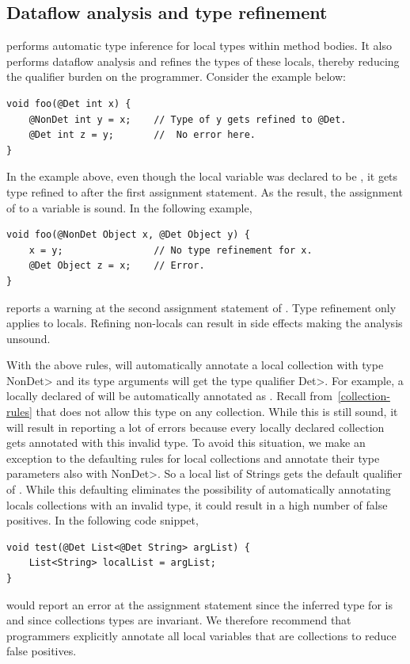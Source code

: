 \subsection{Dataflow analysis and type refinement}\label{dataflow}
\TheDeterminismChecker performs automatic type inference for local types within method bodies.
It also performs dataflow analysis and refines the types of these locals, thereby reducing the qualifier burden 
on the programmer. Consider the example below:
\begin{verbatim}
void foo(@Det int x) {
    @NonDet int y = x;    // Type of y gets refined to @Det.
    @Det int z = y;       //  No error here.
}
\end{verbatim}
In the example above, even though the local variable  was declared to be , it gets
type refined to  after the first assignment statement. As the result, the assignment of 
to a  variable  is sound. In the following example,
\begin{verbatim}
void foo(@NonDet Object x, @Det Object y) {
    x = y;                // No type refinement for x.
    @Det Object z = x;    // Error.
}
\end{verbatim}
\theDeterminismChecker reports a warning at the second assignment statement of . Type refinement only applies to locals. Refining non-locals can result in side effects making the analysis unsound.

With the above rules, \theDeterminismChecker will automatically annotate a local collection with type \<NonDet> and its
type arguments will get the type qualifier \<Det>. For example, a locally declared  of  will be automatically annotated
as . Recall from~\cref{collection-rules} that \theDeterminismChecker does not allow this type on
any collection. While this is still sound, it will result in \theDeterminismChecker reporting a lot of errors because every locally declared 
collection gets annotated with this invalid type. To avoid this situation, we make an exception to the defaulting rules for local collections
and annotate their type parameters also with \<NonDet>. So a local list of Strings gets the default qualifier of . While this defaulting eliminates the possibility of automatically annotating locals collections with an invalid
type, it could result in a high number of false positives. In the following code snippet,
\begin{verbatim}
void test(@Det List<@Det String> argList) {
    List<String> localList = argList;
}    
\end{verbatim}
\theDeterminismChecker would report an error at the assignment statement since the inferred type for  is 
 and since collections types are invariant.
We therefore recommend that programmers explicitly annotate
all local variables that are collections to reduce false positives.

